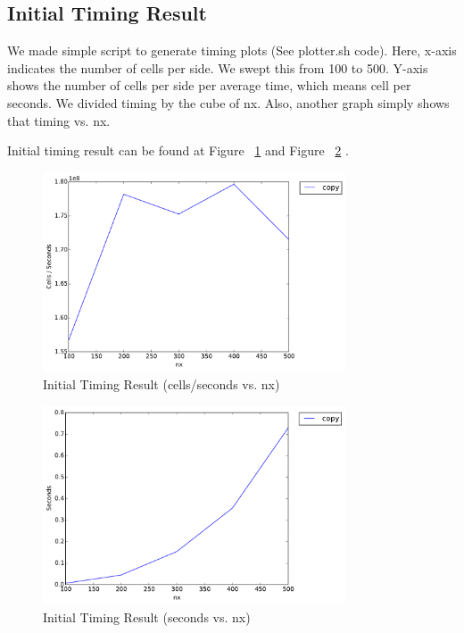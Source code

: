 \subsection{Initial Timing Result}
We made simple script to generate timing plots (See plotter.sh code). Here, x-axis indicates the number of cells per side. We swept this from 100 to 500. Y-axis shows the number of cells per side per average time, which means cell per seconds. We divided timing by the cube of nx. Also, another graph simply shows that timing vs. nx.

Initial timing result can be found at Figure ~\ref{fig:initial_timing_result1} and Figure ~\ref{fig:initial_timing_result2} .

\begin{figure}[h]
    \centering
    \includegraphics[width=0.8\textwidth]{figs/init-timing1.pdf}
    \caption{Initial Timing Result (cells/seconds vs. nx)}
    \label{fig:initial_timing_result1}
\end{figure}

\begin{figure}[h]
    \centering
    \includegraphics[width=0.8\textwidth]{figs/init-timing2.pdf}
    \caption{Initial Timing Result (seconds vs. nx)}
    \label{fig:initial_timing_result2}
\end{figure}
